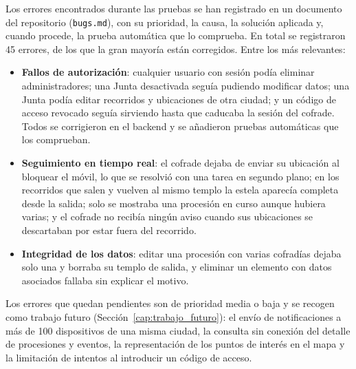 Los errores encontrados durante las pruebas se han registrado en un documento del repositorio (\texttt{bugs.md}), con su prioridad, la causa, la solución aplicada y, cuando procede, la prueba automática que lo comprueba. En total se registraron 45 errores, de los que la gran mayoría están corregidos. Entre los más relevantes:

\begin{itemize}
    \item \textbf{Fallos de autorización}: cualquier usuario con sesión podía eliminar administradores; una Junta desactivada seguía pudiendo modificar datos; una Junta podía editar recorridos y ubicaciones de otra ciudad; y un código de acceso revocado seguía sirviendo hasta que caducaba la sesión del cofrade. Todos se corrigieron en el backend y se añadieron pruebas automáticas que los comprueban.
    \item \textbf{Seguimiento en tiempo real}: el cofrade dejaba de enviar su ubicación al bloquear el móvil, lo que se resolvió con una tarea en segundo plano; en los recorridos que salen y vuelven al mismo templo la estela aparecía completa desde la salida; solo se mostraba una procesión en curso aunque hubiera varias; y el cofrade no recibía ningún aviso cuando sus ubicaciones se descartaban por estar fuera del recorrido.
    \item \textbf{Integridad de los datos}: editar una procesión con varias cofradías dejaba solo una y borraba su templo de salida, y eliminar un elemento con datos asociados fallaba sin explicar el motivo.
\end{itemize}

Los errores que quedan pendientes son de prioridad media o baja y se recogen como trabajo futuro (Sección~\ref{cap:trabajo_futuro}): el envío de notificaciones a más de 100 dispositivos de una misma ciudad, la consulta sin conexión del detalle de procesiones y eventos, la representación de los puntos de interés en el mapa y la limitación de intentos al introducir un código de acceso.
